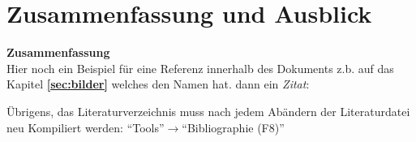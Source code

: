 \section{Zusammenfassung und Ausblick}
\label{sec:zusammenfassung}

\textbf{Zusammenfassung}\vspace{1mm}\\
Hier noch ein Beispiel für eine Referenz innerhalb des Dokuments z.b. auf das Kapitel \textbf{\ref{sec:bilder}} welches den Namen \textbf{} hat. dann ein \textit{Zitat}: \cite{Beyer2015}

Übrigens, das Literaturverzeichnis muss nach jedem Abändern der Literaturdatei neu Kompiliert werden: "`Tools"'$\rightarrow$"`Bibliographie (F8)"'

\clearpage